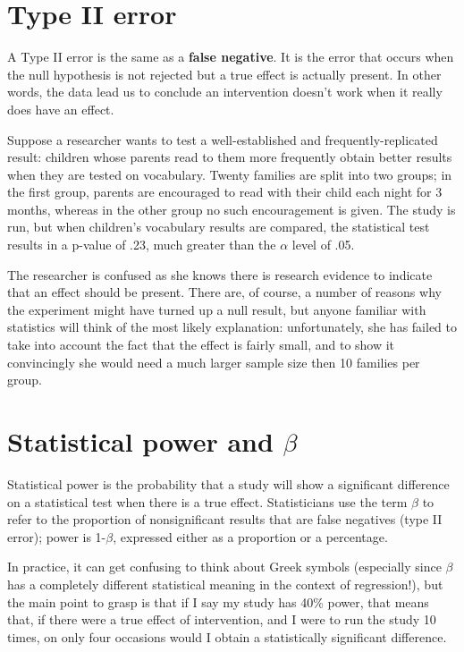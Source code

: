 \documentclass{krantz}
\begin{document}
\hypertarget{type-ii-error}{%
\section{Type II error}\label{type-ii-error}}

A Type II error is the same as a \textbf{false negative}. It is the error that occurs when the null hypothesis is not rejected but a true effect is actually present. In other words, the data lead us to conclude an intervention doesn't work when it really does have an effect.

Suppose a researcher wants to test a well-established and frequently-replicated result: children whose parents read to them more frequently obtain better results when they are tested on vocabulary. Twenty families are split into two groups; in the first group, parents are encouraged to read with their child each night for 3 months, whereas in the other group no such encouragement is given. The study is run, but when children's vocabulary results are compared, the statistical test results in a p-value of .23, much greater than the \(\alpha\) level of .05.

The researcher is confused as she knows there is research evidence to indicate that an effect should be present. There are, of course, a number of reasons why the experiment might have turned up a null result, but anyone familiar with statistics will think of the most likely explanation: unfortunately, she has failed to take into account the fact that the effect is fairly small, and to show it convincingly she would need a much larger sample size then 10 families per group.

\hypertarget{statistical-power-and-beta}{%
\section{\texorpdfstring{Statistical power and \(\beta\)}{Statistical power and \textbackslash beta}}\label{statistical-power-and-beta}}

Statistical power is the probability that a study will show a significant difference on a statistical test when there is a true effect. Statisticians use the term \(\beta\) to refer to the proportion of nonsignificant results that are false negatives (type II error); power is 1-\(\beta\), expressed either as a proportion or a percentage.

In practice, it can get confusing to think about Greek symbols (especially since \(\beta\) has a completely different statistical meaning in the context of regression!), but the main point to grasp is that if I say my study has 40\% power, that means that, if there were a true effect of intervention, and I were to run the study 10 times, on only four occasions would I obtain a statistically significant difference.
\end{document}
